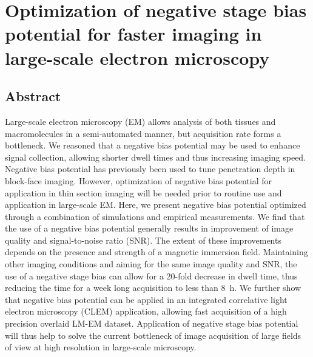 \chapter[Optimization of negative stage bias potential]{Optimization of negative stage bias potential for faster imaging in large-scale electron microscopy}
\label{chap:2}
\begin{refsection}

\section*{Abstract}
\begin{small}
    Large-scale electron microscopy (EM) allows analysis of both tissues and macromolecules in a semi-automated manner, but acquisition rate forms a bottleneck. We reasoned that a negative bias potential may be used to enhance signal collection, allowing shorter dwell times and thus increasing imaging speed. Negative bias potential has previously been used to tune penetration depth in block-face imaging. However, optimization of negative bias potential for application in thin section imaging will be needed prior to routine use and application in large-scale EM. Here, we present negative bias potential optimized through a combination of simulations and empirical measurements. We find that the use of a negative bias potential generally results in improvement of image quality and signal-to-noise ratio (SNR). The extent of these improvements depends on the presence and strength of a magnetic immersion field. Maintaining other imaging conditions and aiming for the same image quality and SNR, the use of a negative stage bias can allow for a 20-fold decrease in dwell time, thus reducing the time for a week long acquisition to less than \SI{8}{\hour}. We further show that negative bias potential can be applied in an integrated correlative light electron microscopy (CLEM) application, allowing fast acquisition of a high precision overlaid LM-EM dataset. Application of negative stage bias potential will thus help to solve the current bottleneck of image acquisition of large fields of view at high resolution in large-scale microscopy.
\end{small}

\clearpage









\printbibliography[title={References}]
\end{refsection}
